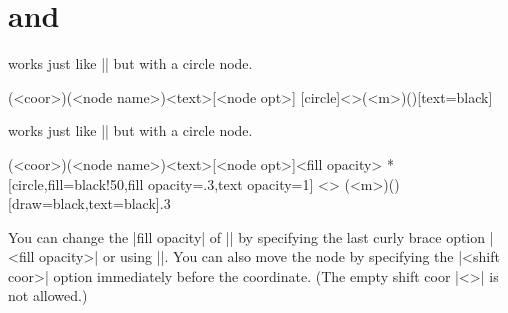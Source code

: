 \section{\protect\cmd{\tznodecircle} and \protect\cmd{\tznodecircle*}}
\label{s:tznodecircle}

\icmd{\tznodecircle} works just like |\tznodeframe| but with a circle node.

\begin{tzdef}{}
(<coor>)(<node name>){<text>}[<node opt>]
  [circle]<>(<m>)(){}[text=black]
\end{tzdef}

\icmd{\tznodecircle*} works just like |\tznodeframe*| but with a circle node.

\begin{tzdef}{}
              (<coor>)(<node name>){<text>}[<node opt>]{<fill opacity>}
 *[circle,fill=black!50,fill opacity=.3,text opacity=1] <>
  (<m>)(){}[draw=black,text=black]{.3}
\end{tzdef}

\begin{tzcode}{.3}
{}
\end{tzcode}

You can change the |fill opacity| of |\tznodecircle*| by specifying the last curly brace option |{<fill opacity>}| or using |\settzfillopacity|. You can also move the node by specifying the |<shift coor>| option immediately before the coordinate.
(The empty shift coor |<>| is not allowed.)

\begin{tzcode}{.3}
\end{tzcode}



